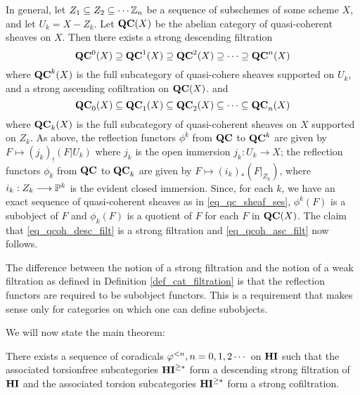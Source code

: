 \begin{ex}
In general, let $Z_1 \subseteq Z_2 \subseteq \cdots \Z_n$ be
a sequence of subschemes of some scheme $X$, and let $U_k =
X - Z_k$. Let $\QCoh(X)$ be the abelian category of quasi-coherent 
sheaves on $X$. Then there exists a strong descending filtration 
\begin{equation}\label{eq_qcoh_desc_filt}
\QCoh^0(X) \supseteq \QCoh^1(X) \supseteq \QCoh^2(X) \supseteq 
   \cdots \supseteq \QCoh^n(X)
\end{equation}
where $\QCoh^k(X)$ is the full subcategory of quasi-cohere sheaves
supported on $U_k$, and a strong ascending cofiltration on 
$\QCoh(X)$. 
and 
\begin{equation}\label{eq_qcoh_asc_filt}
\QCoh_0(X) \subseteq \QCoh_1(X) \subseteq \QCoh_2(X) \subseteq \cdots
\subseteq \QCoh_n(X)
\end{equation}
where $\QCoh_k(X)$ is the full subcategory of quasi-coherent 
sheaves on $X$ supported on $Z_k$. As above, the reflection 
functors $\phi^k$ from $\QCoh$ to $\QCoh^k$ are given by $F 
\mapsto (j_k)_!(F|U_k)$ where $j_k$ is the open immersion $j_k: 
U_k \to X$; the reflection functors $\phi_k$ from $\QCoh$ to 
$\QCoh_k$ are given by $F \mapsto (i_k)_*(F|_{Z_k})$, where $i_k: 
Z_k \to \P^k$ is the evident closed immersion. Since, for each 
$k$, we have an exact sequence of quasi-coherent sheaves as in
\eqref{eq_qc_sheaf_ses}, $\phi^k(F)$ is a subobject of $F$ and
$\phi_k(F)$ is a quotient of $F$ for each $F$ in $\QCoh(X)$.
The claim that \eqref{eq_qcoh_desc_filt} is a strong filtration
and \eqref{eq_qcoh_asc_filt} now follows.
\end{ex}

\begin{rmk}
The difference between the notion of a strong filtration and 
the notion of a weak filtration as defined in Definition
\ref{def_cat_filtration} is that the reflection functors  are
required to be subobject functors. This is a requirement that
makes sense only for categories on which one can define
subobjects.
\end{rmk}

We will now state the main theorem:

\begin{thm}\label{thm_main_result}
There exists a sequence of coradicals $\tlHI{n}, n = 0, 1, 2 
\cdots$ on $\HI$ such that the associated torsionfree 
subcategories $\TGHI{*}{\HI}$ form a descending strong filtration
of $\HI$ and the associated torsion subcategories $\TGHI{*}{\HI}$ 
form a strong cofiltration.
\end{thm}

